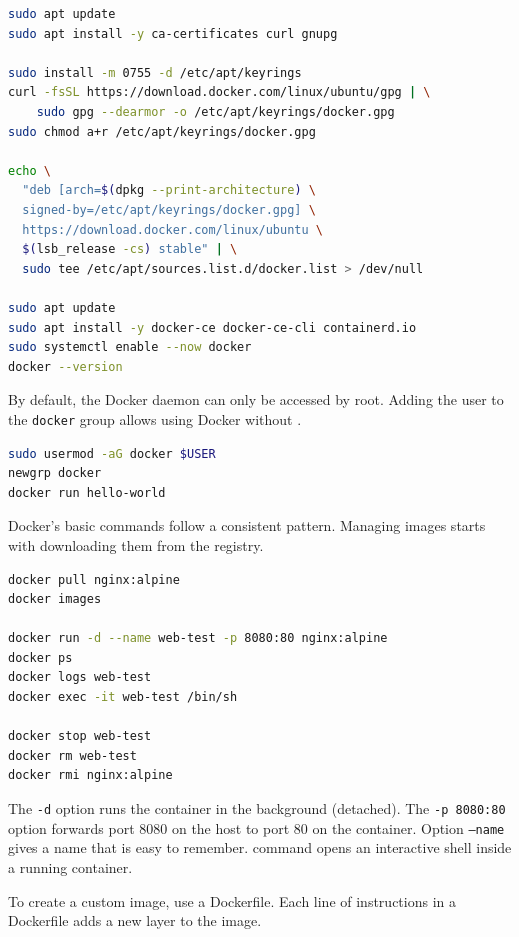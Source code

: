 \begin{lstlisting}[language=bash, caption={Installing Docker Engine on Ubuntu}]
sudo apt update
sudo apt install -y ca-certificates curl gnupg

sudo install -m 0755 -d /etc/apt/keyrings
curl -fsSL https://download.docker.com/linux/ubuntu/gpg | \
    sudo gpg --dearmor -o /etc/apt/keyrings/docker.gpg
sudo chmod a+r /etc/apt/keyrings/docker.gpg

echo \
  "deb [arch=$(dpkg --print-architecture) \
  signed-by=/etc/apt/keyrings/docker.gpg] \
  https://download.docker.com/linux/ubuntu \
  $(lsb_release -cs) stable" | \
  sudo tee /etc/apt/sources.list.d/docker.list > /dev/null

sudo apt update
sudo apt install -y docker-ce docker-ce-cli containerd.io
sudo systemctl enable --now docker
docker --version
\end{lstlisting}

By default, the Docker daemon can only be accessed by root. Adding the user to the \texttt{docker} group allows using Docker without .

\begin{lstlisting}[language=bash, caption={Allows users to use Docker without sudo}]
sudo usermod -aG docker $USER
newgrp docker
docker run hello-world
\end{lstlisting}

Docker's basic commands follow a consistent pattern. Managing images starts with downloading them from the registry.

\begin{lstlisting}[language=bash, caption={Manage images and run containers}]
docker pull nginx:alpine
docker images

docker run -d --name web-test -p 8080:80 nginx:alpine
docker ps
docker logs web-test
docker exec -it web-test /bin/sh

docker stop web-test
docker rm web-test
docker rmi nginx:alpine
\end{lstlisting}

The \texttt{-d} option runs the container in the background (detached). The \texttt{-p 8080:80} option forwards port 8080 on the host to port 80 on the container. Option
\texttt{--name} gives a name that is easy to remember.  command
opens an interactive shell inside a running container.

To create a custom image, use a Dockerfile. Each line of instructions in a Dockerfile adds a new layer to the image.


